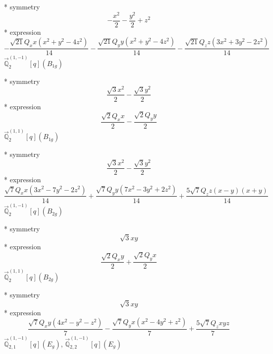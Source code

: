 \documentclass[fleqn,8pt]{jsarticle}
\begin{document}
\noindent\quad ** symmetry
\begin{dmath*}
- \frac{x^{2}}{2} - \frac{y^{2}}{2} + z^{2}
\end{dmath*}
\noindent\quad ** expression
\begin{dmath*}
- \frac{\sqrt{21} Q_{x} x \left(x^{2} + y^{2} - 4 z^{2}\right)}{14} - \frac{\sqrt{21} Q_{y} y \left(x^{2} + y^{2} - 4 z^{2}\right)}{14} - \frac{\sqrt{21} Q_{z} z \left(3 x^{2} + 3 y^{2} - 2 z^{2}\right)}{14}
\end{dmath*}
\noindent\quad $\vec{\mathbb{Q}}_{2}^{(1,-1)}[q](B_{1g})$

\noindent\quad ** symmetry
\begin{dmath*}
\frac{\sqrt{3} x^{2}}{2} - \frac{\sqrt{3} y^{2}}{2}
\end{dmath*}
\noindent\quad ** expression
\begin{dmath*}
\frac{\sqrt{2} Q_{x} x}{2} - \frac{\sqrt{2} Q_{y} y}{2}
\end{dmath*}
\noindent\quad $\vec{\mathbb{Q}}_{2}^{(1,1)}[q](B_{1g})$

\noindent\quad ** symmetry
\begin{dmath*}
\frac{\sqrt{3} x^{2}}{2} - \frac{\sqrt{3} y^{2}}{2}
\end{dmath*}
\noindent\quad ** expression
\begin{dmath*}
\frac{\sqrt{7} Q_{x} x \left(3 x^{2} - 7 y^{2} - 2 z^{2}\right)}{14} + \frac{\sqrt{7} Q_{y} y \left(7 x^{2} - 3 y^{2} + 2 z^{2}\right)}{14} + \frac{5 \sqrt{7} Q_{z} z \left(x - y\right) \left(x + y\right)}{14}
\end{dmath*}
\noindent\quad $\vec{\mathbb{Q}}_{2}^{(1,-1)}[q](B_{2g})$

\noindent\quad ** symmetry
\begin{dmath*}
\sqrt{3} x y
\end{dmath*}
\noindent\quad ** expression
\begin{dmath*}
\frac{\sqrt{2} Q_{x} y}{2} + \frac{\sqrt{2} Q_{y} x}{2}
\end{dmath*}
\noindent\quad $\vec{\mathbb{Q}}_{2}^{(1,1)}[q](B_{2g})$

\noindent\quad ** symmetry
\begin{dmath*}
\sqrt{3} x y
\end{dmath*}
\noindent\quad ** expression
\begin{dmath*}
\frac{\sqrt{7} Q_{x} y \left(4 x^{2} - y^{2} - z^{2}\right)}{7} - \frac{\sqrt{7} Q_{y} x \left(x^{2} - 4 y^{2} + z^{2}\right)}{7} + \frac{5 \sqrt{7} Q_{z} x y z}{7}
\end{dmath*}
\noindent\quad $\vec{\mathbb{Q}}_{2,1}^{(1,-1)}[q](E_{g})$, $\vec{\mathbb{Q}}_{2,2}^{(1,-1)}[q](E_{g})$
\end{document}
